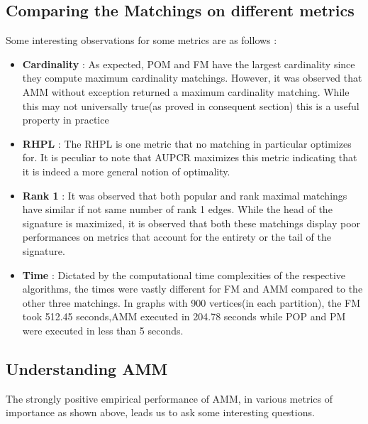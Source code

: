 \documentclass[letterpaper]{article} %
\begin{document}
\subsection{Comparing the Matchings on different metrics}
Some interesting observations for some metrics are as follows :
\begin{itemize}
\item \textbf{Cardinality} : As expected, POM and FM have the largest cardinality since they compute maximum cardinality matchings. However, it was observed that AMM without exception returned a maximum cardinality matching. While this may not universally true(as proved in consequent section) this is a useful property in practice
\item \textbf{RHPL} : The RHPL is one metric that no matching in particular optimizes for. It is peculiar to note that  AUPCR maximizes this metric indicating that it is indeed a more general notion of optimality.
\item \textbf{Rank 1} : It was observed that both popular and rank maximal matchings have similar if not same number of rank 1 edges. While the head of the signature is maximized, it is observed that both these matchings display poor performances on metrics that account for the entirety or the tail of the signature.
\item \textbf{Time} : Dictated by the computational time complexities of the respective algorithms, the times were vastly different for FM and AMM compared to the other three matchings. In graphs with 900 vertices(in each partition), the FM took 512.45 seconds,AMM executed in 204.78 seconds while POP and PM were executed in less than 5 seconds.
\end{itemize}

\subsection{Understanding AMM}
The strongly positive empirical performance of AMM, in various metrics of importance as shown above, leads us to ask some interesting questions.
\end{document}
